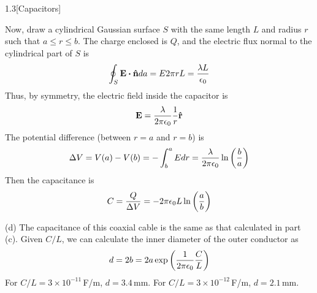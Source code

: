\documentclass[12pt]{article}
\begin{document}
\begin{problem}{1.3}[Capacitors]
\begin{solution}
    Now, draw a cylindrical Gaussian surface $S$ with the same length $L$ and 
    radius $r$ such that $a\leq r\leq b$. The charge enclosed is $Q$, and the 
    electric flux normal to the cylindrical part of $S$ is
    \begin{equation}
        \oint_S\vb{E}\vdot\nhat da=E2\pi rL=\frac{\lambda L}{\epsilon_0}
    \end{equation}
    Thus, by symmetry, the electric field inside the capacitor is
    \begin{equation}
        \vb{E}=\frac{\lambda}{2\pi\epsilon_0}\frac1r\vb{\hat{r}} 
    \end{equation}
    The potential difference (between $r=a$ and $r=b$) is
    \begin{equation}
        \Delta V=V(a)-V(b)=-\int_b^aEdr=\frac{\lambda}{2\pi\epsilon_0}
            \ln\qty(\frac{b}{a})
    \end{equation}
    Then the capacitance is
    \begin{equation}
        C=\frac{Q}{\Delta V}=-2\pi\epsilon_0L\ln\qty(\frac{a}{b})
    \end{equation}

    (d) The capacitance of this coaxial cable is the same as that calculated in
    part (c). Given $C/L$, we can calculate the inner diameter of the outer
    conductor as
    \begin{equation}
        d=2b=2a\exp\qty(\frac1{2\pi\epsilon_0}\frac{C}{L}) 
    \end{equation}
    For $C/L=3\times10^{-11}$\,\si{F/m}, $d=3.4$\,\si{mm}. For
    $C/L=3\times10^{-12}$\,\si{F/m}, $d=2.1$\,\si{mm}.

\end{solution}
    
\end{problem}
\end{document}
